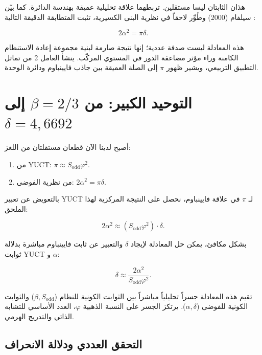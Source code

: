 \documentclass[12pt,a4paper]{article}
\begin{document}
	هذان الثابتان ليسا مستقلين. تربطهما علاقة تحليلية عميقة بهندسة الدائرة. كما بيّن سيلفام (2000) وطُوِّر لاحقاً في نظرية البنى الكسيرية، تثبت المتطابقة الدقيقة التالية \cite{Selvam2000}:
	
	\begin{equation}
		2\alpha^2 = \pi \delta.
		\label{eq:feigenbaum-pi}
	\end{equation}
	
	هذه المعادلة ليست صدفة عددية؛ إنها نتيجة صارمة لبنية مجموعة إعادة الاستنظام الكامنة وراء مؤثر مضاعفة الدور في المستوي المركّب. ينشأ العامل 2 من تماثل التطبيق التربيعي، ويشير ظهور \(\pi\) إلى الصلة العميقة بين جاذب فايينباوم ودائرة الوحدة.
	
	\section{التوحيد الكبير: من \(\beta = 2/3\) إلى \(\delta = 4{,}6692\)}
	
	أصبح لدينا الآن قطعان مستقلتان من اللغز:
	\begin{enumerate}
		\item من YUCT: \(\pi \approx S_{\mathrm{odd}}\varphi^2\).
		\item من نظرية الفوضى: \(2\alpha^2 = \pi \delta\).
	\end{enumerate}
	
	بالتعويض عن تعبير YUCT لـ \(\pi\) في علاقة فايينباوم، نحصل على النتيجة المركزية لهذا الملحق:
	
	\begin{equation}
		\boxed{2\alpha^2 \approx (S_{\mathrm{odd}}\varphi^2) \cdot \delta}.
		\label{eq:unification}
	\end{equation}
	
	بشكل مكافئ، يمكن حل المعادلة لإيجاد \(\delta\) والتعبير عن ثابت فايينباوم مباشرة بدلالة ثوابت YUCT و \(\alpha\):
	
	\begin{equation}
		\delta \approx \frac{2\alpha^2}{S_{\mathrm{odd}}\varphi^2}.
	\end{equation}
	
	تقيم هذه المعادلة جسراً تحليلياً مباشراً بين الثوابت الكونية للنظام (\(\beta, S_{\mathrm{odd}}\)) والثوابت الكونية للفوضى (\(\alpha, \delta\)). يرتكز الجسر على النسبة الذهبية \(\varphi\)، العدد الأساسي للتشابه الذاتي والتدريج الهرمي.
	
	\subsection{التحقق العددي ودلالة الانحراف}
	
\end{document}
